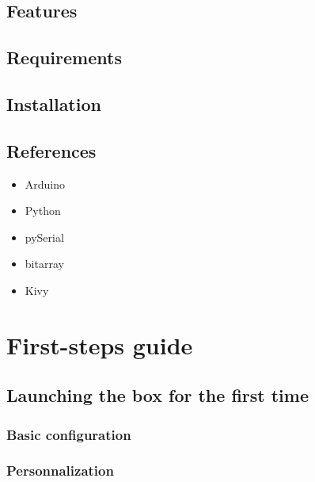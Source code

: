 \documentclass[letterpaper,10pt,english]{sphinxmanual}
\begin{document}
\section{Features}
\label{the_project:features}

\section{Requirements}
\label{the_project:requirements}

\section{Installation}
\label{the_project:installation}

\section{References}
\label{the_project:references}\begin{itemize}
\item {} 
Arduino

\item {} 
Python

\item {} 
pySerial

\item {} 
bitarray

\item {} 
Kivy

\end{itemize}


\chapter{First-steps guide}
\label{first_steps::doc}\label{first_steps:first-steps-guide}

\section{Launching the box for the first time}
\label{first_steps:launching-the-box-for-the-first-time}

\subsection{Basic configuration}
\label{first_steps:basic-configuration}

\subsection{Personnalization}
\label{first_steps:personnalization}
\end{document}
